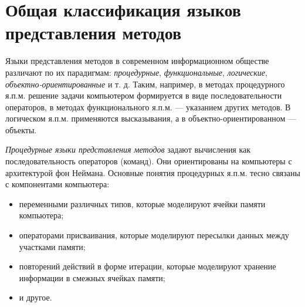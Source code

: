 \section{Общая классификация языков представления методов}

Языки представления методов в современном информационном обществе различают по их парадигмам: \textit{процедурные}, \textit{функциональные}, \textit{логические}, \textit{объектно-ориентированные} и т. д. Таким, например, в методах процедурного я.п.м. решение задачи компьютером формируется в виде последовательности операторов, в методах функционального я.п.м. — указанием других методов. В логическом я.п.м. применяются высказывания, а в объектно-ориентированном — объекты.

\begin{SCn}
\begin{scnindent}
\end{scnindent}
\begin{scnindent}
\end{scnindent}
\begin{scnindent}
    \begin{scneqtoset}
    \end{scneqtoset}
\end{scnindent}
\end{SCn}

\textit{Процедурные языки представления методов} задают вычисления как последовательность операторов (команд).
Они ориентированы на компьютеры с архитектурой фон Неймана. Основные понятия процедурных я.п.м. тесно связаны с компонентами компьютера:
\begin{itemize}
    \item переменными различных типов, которые моделируют ячейки памяти компьютера;
    \item операторами присваивания, которые моделируют пересылки данных между участками памяти;
    \item повторений действий в форме итерации, которые моделируют хранение информации в смежных ячейках памяти;
    \item и другое.
\end{itemize}

